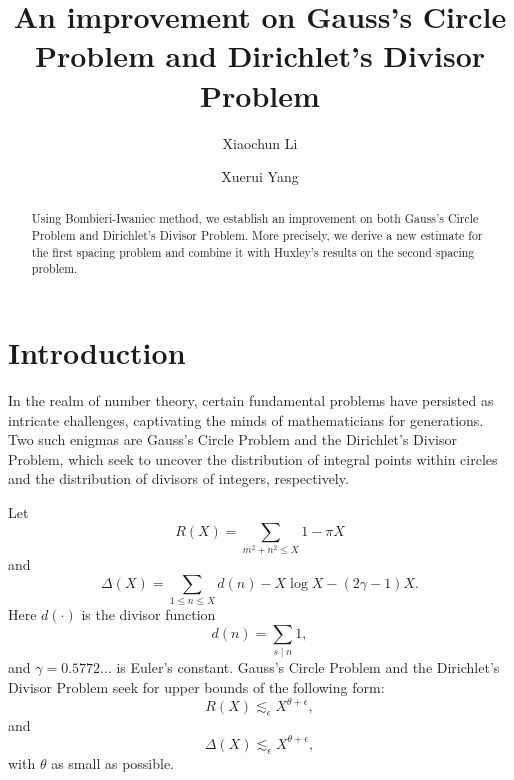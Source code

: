 \documentclass[11pt]{amsart}
\numberwithin{equation}{section}
\theoremstyle{definition}
\theoremstyle{proposition}
\begin{document}
\title[Improvement on the Circle and Divisor Problems]
{An improvement on Gauss's Circle Problem and Dirichlet's Divisor Problem}
  
\author{Xiaochun Li}

\address{Xiaochun Li\\
Department of Mathematics\\
University of Illinois at Urbana-Champaign\\
Urbana, IL, 61801, USA}



\author{Xuerui Yang}

\address{ Xuerui Yang\\
Department of Mathematics\\
University of Illinois at Urbana-Champaign\\
Urbana, IL, 61801, USA}



\date{}


\begin{abstract}
Using Bombieri-Iwaniec method, we establish an improvement on both Gauss's Circle Problem and Dirichlet's Divisor Problem. More precisely, we derive a new estimate for the first spacing problem and combine it with Huxley's results on the second spacing problem.
\end{abstract}

\maketitle


\section{Introduction}  

In the realm of number theory, certain fundamental problems have persisted as intricate challenges, captivating the minds of mathematicians for generations. Two such enigmas are Gauss's Circle Problem and the Dirichlet's Divisor Problem, which seek to uncover the distribution of integral points within circles and the distribution of divisors of integers, respectively. 


Let 
\begin{equation}  \label{circle problem}
R(X)=\sum_{m^2+n^2\le X} 1-\pi X    
\end{equation}
and 
\begin{equation}  \label{divisor problem}
\Delta(X)=\sum_{1\le n\le X} d(n) - X\log X -(2\gamma-1)X.
\end{equation}
Here $d(\cdot)$ is the divisor function
\[
d(n)=\sum_{s\mid n} 1, 
\]
and $\gamma=0.5772\dots$ is Euler's constant. Gauss's Circle Problem and the Dirichlet's Divisor Problem seek for upper bounds of the following form:
\[
R(X)\lesssim_\epsilon X^{\theta+\epsilon}, 
\]
and 
\[
\Delta(X)\lesssim_\epsilon X^{\theta+\epsilon},
\]
with $\theta$ as small as possible. 
\end{document}

